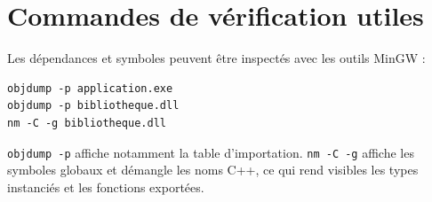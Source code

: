 \documentclass[11pt,a4paper]{article}
\begin{document}
\appendix
\section{Commandes de vérification utiles}

Les dépendances et symboles peuvent être inspectés avec les outils MinGW :

\begin{lstlisting}[style=console]
objdump -p application.exe
objdump -p bibliotheque.dll
nm -C -g bibliotheque.dll
\end{lstlisting}

\texttt{objdump -p} affiche notamment la table d'importation. \texttt{nm -C -g} affiche les symboles globaux et démangle les noms C++, ce qui rend visibles les types instanciés et les fonctions exportées.
\end{document}
